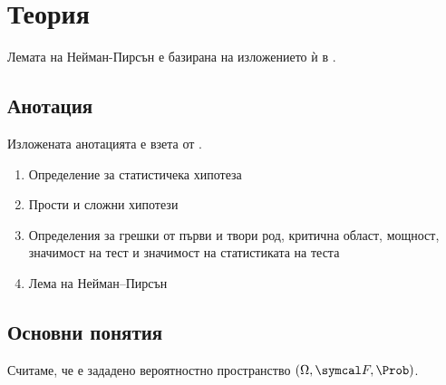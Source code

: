 \documentclass[
  headings=standardclasses,
  bibliography=totocnumbered,
]{scrartcl}
\title{\Title{19}}
\subtitle{Проверка на хипотези.}
\author{Янис Василев}
\date{\Revision{28 юни 2019}}
\begin{document}
\maketitle

\section{Теория}

Лемата на Нейман-Пирсън е базирана на изложението ѝ в \cite{DimitrovYanev}.

\subsection{Анотация}

Изложената анотацията е взета от \cite{Syllabus}.

\begin{enumerate}
  \item Определение за статистичека хипотеза
  \item Прости и сложни хипотези
  \item Определения за грешки от първи и твори род, критична област, мощност, значимост на тест и значимост на статистиката на теста
  \item Лема на Нейман–Пирсън
\end{enumerate}

\subsection{Основни понятия}

Считаме, че е зададено вероятностно пространство \( (\Omega, \F, \Prob) \).
\end{document}

